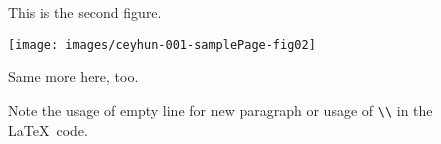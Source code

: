 \documentclass[11pt]{amsbook}
\begin{document}
This is the second figure.

\texttt{[image: images/ceyhun-001-samplePage-fig02]}

Same more here, too.

Note the usage of empty line for new paragraph or usage of \verb!\\! in the \LaTeX\ code.











\begin{exmp}

\end{exmp}
\end{document}
